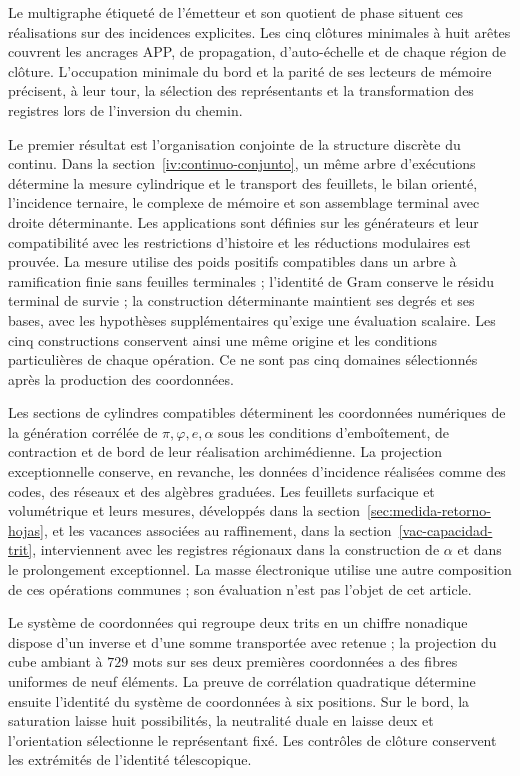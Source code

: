 Le multigraphe étiqueté de l’émetteur et son quotient de phase situent ces
réalisations sur des incidences explicites. Les cinq clôtures minimales
à huit arêtes couvrent les ancrages APP, de propagation, d’auto-échelle
et de chaque région de clôture. L’occupation minimale du bord et la
parité de ses lecteurs de mémoire précisent, à leur tour, la sélection des
représentants et la transformation des registres lors de l’inversion du chemin.

Le premier résultat est l’organisation conjointe de la structure
discrète du continu. Dans la section~\ref{iv:continuo-conjunto}, un
même arbre d’exécutions détermine la mesure cylindrique et le transport
des feuillets, le bilan orienté, l’incidence ternaire, le complexe
de mémoire et son assemblage terminal avec droite déterminante. Les applications
sont définies sur les générateurs et leur compatibilité avec les
restrictions d’histoire et les réductions modulaires est prouvée. La mesure
utilise des poids positifs compatibles dans un arbre à ramification finie
sans feuilles terminales ; l’identité de Gram conserve le résidu terminal
de survie ; la construction déterminante maintient ses degrés et
ses bases, avec les hypothèses supplémentaires qu’exige une évaluation
scalaire. Les cinq constructions conservent ainsi une même origine et les
conditions particulières de chaque opération. Ce ne sont pas cinq domaines
sélectionnés après la production des coordonnées.

Les sections de cylindres compatibles déterminent les coordonnées
numériques de la génération corrélée de \(\pi,\varphi,e,\alpha\)
sous les conditions d’emboîtement, de contraction et de bord
de leur réalisation archimédienne. La projection exceptionnelle conserve,
en revanche, les données d’incidence réalisées comme des codes,
des réseaux et des algèbres graduées. Les feuillets surfacique et volumétrique et leurs
mesures, développés dans la section~\ref{sec:medida-retorno-hojas},
et les vacances associées au raffinement, dans la
section~\ref{vac-capacidad-trit}, interviennent avec les registres
régionaux dans la construction de \(\alpha\) et dans le prolongement
exceptionnel. La masse électronique utilise une autre composition de ces
opérations communes ; son évaluation n’est pas l’objet de cet article.

Le système de coordonnées qui regroupe deux trits en un chiffre nonadique dispose d’un inverse
et d’une somme transportée avec retenue ; la projection du cube ambiant
à \(729\) mots sur ses deux premières coordonnées a des fibres
uniformes de neuf éléments. La preuve de corrélation quadratique
détermine ensuite l’identité du système de coordonnées à six positions.
Sur le bord, la saturation laisse huit possibilités, la neutralité
duale en laisse deux et l’orientation sélectionne le représentant fixé.
Les contrôles de clôture conservent les extrémités de l’identité
télescopique. 

